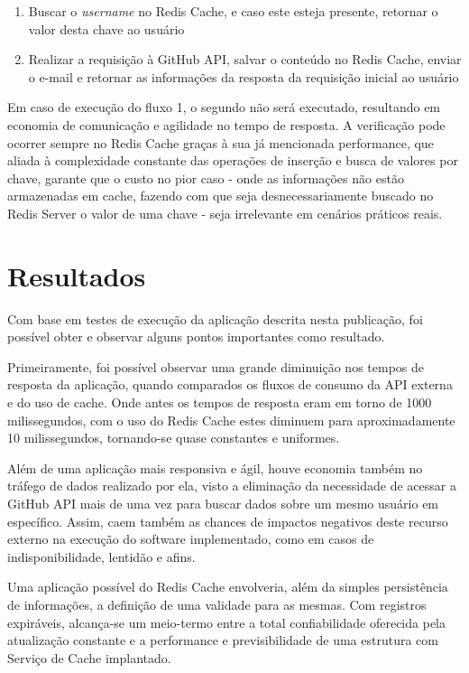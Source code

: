 \documentclass[12pt]{article}
\begin{document}
\begin{enumerate}
    \item Buscar o \textit{username} no Redis Cache, e caso este esteja presente, retornar o valor desta chave ao usuário
    \item Realizar a requisição à GitHub API, salvar o conteúdo no Redis Cache, enviar o e-mail e retornar as informações da resposta da requisição inicial ao usuário
\end{enumerate}

Em caso de execução do fluxo 1, o segundo não será executado, resultando em economia de comunicação e agilidade no tempo de resposta. A verificação pode ocorrer sempre no Redis Cache graças à sua já mencionada performance, que aliada à complexidade constante das operações de inserção e busca de valores por chave, garante que o custo no pior caso - onde as informações não estão armazenadas em cache, fazendo com que seja desnecessariamente buscado no Redis Server o valor de uma chave - seja irrelevante em cenários práticos reais.

\section{Resultados}

Com base em testes de execução da aplicação descrita nesta publicação, foi possível obter e observar alguns pontos importantes como resultado.

Primeiramente, foi possível observar uma grande diminuição nos tempos de resposta da aplicação, quando comparados os fluxos de consumo da API externa e do uso de cache. Onde antes os tempos de resposta eram em torno de 1000 milissegundos, com o uso do Redis Cache estes diminuem para aproximadamente 10 milissegundos, tornando-se quase constantes e uniformes.

Além de uma aplicação mais responsiva e ágil, houve economia também no tráfego de dados realizado por ela, visto a eliminação da necessidade de acessar a GitHub API mais de uma vez para buscar dados sobre um mesmo usuário em específico. Assim, caem também as chances de impactos negativos deste recurso externo na execução do software implementado, como em casos de indisponibilidade, lentidão e afins.

Uma aplicação possível do Redis Cache envolveria, além da simples persistência de informações, a definição de uma validade para as mesmas. Com registros expiráveis, alcança-se um meio-termo entre a total confiabilidade oferecida pela atualização constante e a performance e previsibilidade de uma estrutura com Serviço de Cache implantado.
\end{document}
